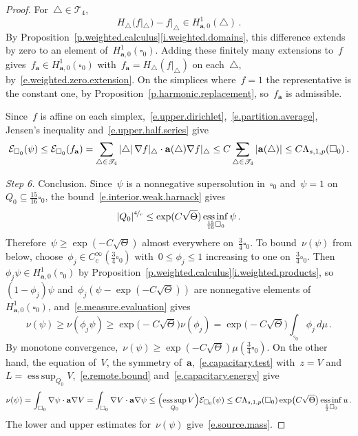 \documentclass[11pt,letterpaper]{article}
\makeatletter
\numberwithin{equation}{section}
\theoremstyle{definition}
\renewcommand{\a}{\mathbf{a}}
\newcommand{\nf}{\nicefrac}
\newcommand{\cu}{\square}
\DeclareMathOperator*{\esssup}{ess\,sup}
\DeclareMathOperator*{\essinf}{ess\,inf}
\newcommand{\Ener}{\mathcal E}
\newcommand{\Hzero}[1]{H^1_{#1,0}}
\newcommand{\avsum}{\mathop{\mathpalette\avsuminner\relax}\displaylimits}
\newcommand\avsuminner[2]{%
	{\sbox0{$\m@th#1\sum$}%
		\vphantom{\usebox0}%
		\ooalign{%
			\hidewidth
			\smash{\,\rule[.23em]{8.8pt}{1.1pt} \relax}%
			\hidewidth\cr
			$\m@th#1\sum$\cr
		}%
	}%
}
\makeatother
\begin{document}
\begin{proof}
For~$\triangle\in\mathscr T_4$,
\begin{equation*}
	H_\triangle(f|_\triangle)-f|_\triangle\in\Hzero{\a}(\triangle)\,.
\end{equation*}
By Proposition~\ref{p.weighted.calculus}\ref{i.weighted.domains}, this difference extends by zero to an element of~$\Hzero{\a}(\cu_0)$. Adding these finitely many extensions to~$f$ gives~$f_\a\in\Hzero{\a}(\cu_0)$ with~$f_\a=H_\triangle(f|_\triangle)$ on each~$\triangle$, by~\eqref{e.weighted.zero.extension}. On the simplices where~$f=1$ the representative is the constant one, by Proposition~\ref{p.harmonic.replacement}, so~$f_\a$ is admissible.

Since~$f$ is affine on each simplex,~\eqref{e.upper.dirichlet},~\eqref{e.partition.average}, Jensen's inequality and~\eqref{e.upper.half.series} give
\begin{equation}
	\Ener_{\cu_0}(\psi)\leq\Ener_{\cu_0}(f_\a)=\sum_{\triangle\in\mathscr T_4}|\triangle|\,\nabla f|_\triangle\cdot\a(\triangle)\nabla f|_\triangle\leq C\avsum_{\triangle\in\mathscr T_4}|\a(\triangle)|\leq C\Lambda_{s,1,p}(\cu_0)\,.
	\label{e.capacitary.energy}
\end{equation}

\smallskip

\emph{Step 6.} Conclusion. Since~$\psi$ is a nonnegative supersolution in~$\cu_0$ and~$\psi=1$ on~$Q_0\subseteq\frac{15}{16}\cu_0$, the bound~\eqref{e.interior.weak.harnack} gives
\begin{equation*}
	|Q_0|^{\nf4r}\leq\exp(C\sqrt\Theta)\essinf_{\frac{15}{16}\cu_0}\psi\,.
\end{equation*}
Therefore~$\psi\geq\exp(-C\sqrt\Theta)$ almost everywhere on~$\frac34\cu_0$. To bound~$\nu(\psi)$ from below, choose~$\phi_j\in C^\infty_c(\frac34\cu_0)$ with~$0\leq\phi_j\leq1$ increasing to one on~$\frac34\cu_0$. Then~$\phi_j\psi\in\Hzero{\a}(\cu_0)$ by Proposition~\ref{p.weighted.calculus}\ref{i.weighted.products}, so~$(1-\phi_j)\psi$ and~$\phi_j(\psi-\exp(-C\sqrt\Theta))$ are nonnegative elements of~$\Hzero{\a}(\cu_0)$, and~\eqref{e.measure.evaluation} gives
\begin{equation*}
	\nu(\psi)\geq\nu(\phi_j\psi)\geq\exp\bigl(-C\sqrt\Theta\bigr)\nu(\phi_j)=\exp\bigl(-C\sqrt\Theta\bigr)\int_{\cu_0}\phi_j\,d\mu\,.
\end{equation*}
By monotone convergence,~$\nu(\psi)\geq\exp(-C\sqrt\Theta)\mu(\frac34\cu_0)$. On the other hand, the equation of~$V$, the symmetry of~$\a$,~\eqref{e.capacitary.test} with~$z=V$ and~$L=\esssup_{Q_0}V$,~\eqref{e.remote.bound} and~\eqref{e.capacitary.energy} give
\begin{equation*}
	\nu(\psi)=\int_{\cu_0}\nabla\psi\cdot\a\nabla V=\int_{\cu_0}\nabla V\cdot\a\nabla\psi\leq\Bigl(\esssup_{Q_0}V\Bigr)\Ener_{\cu_0}(\psi)\leq C\Lambda_{s,1,p}(\cu_0)\exp\bigl(C\sqrt\Theta\bigr)\essinf_{\frac12\cu_0}u\,.
\end{equation*}
The lower and upper estimates for~$\nu(\psi)$ give~\eqref{e.source.mass}.
\end{proof}
\end{document}
